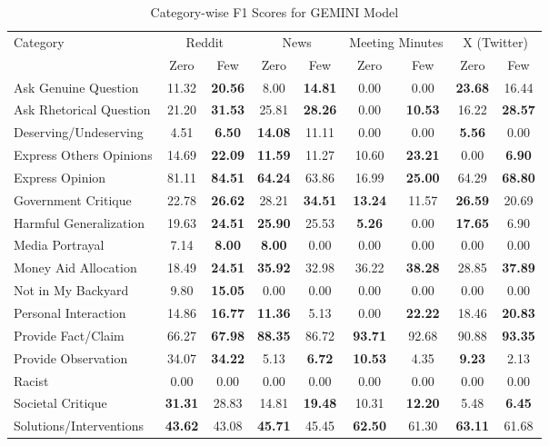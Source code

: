 \begin{table*}[htbp]
\centering
\begin{tabular}{l *{8}{c}}
\toprule
Category & \multicolumn{2}{c}{Reddit} & \multicolumn{2}{c}{News} & \multicolumn{2}{c}{Meeting Minutes} & \multicolumn{2}{c}{X (Twitter)} \\
& Zero & Few & Zero & Few & Zero & Few & Zero & Few \\
\midrule
Ask Genuine Question & 11.32 & \textbf{20.56} & 8.00 & \textbf{14.81} & 0.00 & 0.00 & \textbf{23.68} & 16.44 \\
Ask Rhetorical Question & 21.20 & \textbf{31.53} & 25.81 & \textbf{28.26} & 0.00 & \textbf{10.53} & 16.22 & \textbf{28.57} \\
Deserving/Undeserving & 4.51 & \textbf{6.50} & \textbf{14.08} & 11.11 & 0.00 & 0.00 & \textbf{5.56} & 0.00 \\
Express Others Opinions & 14.69 & \textbf{22.09} & \textbf{11.59} & 11.27 & 10.60 & \textbf{23.21} & 0.00 & \textbf{6.90} \\
Express Opinion & 81.11 & \textbf{84.51} & \textbf{64.24} & 63.86 & 16.99 & \textbf{25.00} & 64.29 & \textbf{68.80} \\
Government Critique & 22.78 & \textbf{26.62} & 28.21 & \textbf{34.51} & \textbf{13.24} & 11.57 & \textbf{26.59} & 20.69 \\
Harmful Generalization & 19.63 & \textbf{24.51} & \textbf{25.90} & 25.53 & \textbf{5.26} & 0.00 & \textbf{17.65} & 6.90 \\
Media Portrayal & 7.14 & \textbf{8.00} & \textbf{8.00} & 0.00 & 0.00 & 0.00 & 0.00 & 0.00 \\
Money Aid Allocation & 18.49 & \textbf{24.51} & \textbf{35.92} & 32.98 & 36.22 & \textbf{38.28} & 28.85 & \textbf{37.89} \\
Not in My Backyard & 9.80 & \textbf{15.05} & 0.00 & 0.00 & 0.00 & 0.00 & 0.00 & 0.00 \\
Personal Interaction & 14.86 & \textbf{16.77} & \textbf{11.36} & 5.13 & 0.00 & \textbf{22.22} & 18.46 & \textbf{20.83} \\
Provide Fact/Claim & 66.27 & \textbf{67.98} & \textbf{88.35} & 86.72 & \textbf{93.71} & 92.68 & 90.88 & \textbf{93.35} \\
Provide Observation & 34.07 & \textbf{34.22} & 5.13 & \textbf{6.72} & \textbf{10.53} & 4.35 & \textbf{9.23} & 2.13 \\
Racist & 0.00 & 0.00 & 0.00 & 0.00 & 0.00 & 0.00 & 0.00 & 0.00 \\
Societal Critique & \textbf{31.31} & 28.83 & 14.81 & \textbf{19.48} & 10.31 & \textbf{12.20} & 5.48 & \textbf{6.45} \\
Solutions/Interventions & \textbf{43.62} & 43.08 & \textbf{45.71} & 45.45 & \textbf{62.50} & 61.30 & \textbf{63.11} & 61.68 \\
\bottomrule
\end{tabular}
\caption{Category-wise F1 Scores for GEMINI Model}
\label{tab:gemini_category_breakdown}
\end{table*}